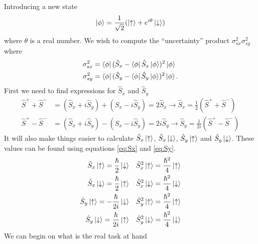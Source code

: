 \documentclass{article}
\begin{document}
Introducing a new state
\begin{equation*}
\ket{\phi}=\frac{1}{\sqrt{2}}(\ket{\uparrow}+e^{i\theta}\ket{\downarrow})
\end{equation*}
where $\theta$ is a real number. We wish to compute the ``uncertainty'' product $\sigma_{sx}^2\sigma_{sy}^2$ where
\begin{align*}
\sigma_{sx}^2 &= \bra{\phi}(\hat{S}_x-\bra{\phi}\hat{S}_x\ket{\phi} )^2\ket{\phi}  \\
\sigma_{sy}^2 &= \bra{\phi}(\hat{S}_y-\bra{\phi}\hat{S}_y\ket{\phi} )^2\ket{\phi}.
\end{align*}
First we need to find expressions for $\hat{S}_x$ and $\hat{S}_y$
\begin{align}
\label{eq:Sx}
\hat{S}^++\hat{S}^- &= (\hat{S}_x + i\hat{S}_y) + (\hat{S}_x-i\hat{S}_y) = 2\hat{S}_x 
\rightarrow \hat{S}_x = \frac{1}{2}(\hat{S}^++\hat{S}^-)\\
\label{eq:Sy}
\hat{S}^+-\hat{S}^- &= (\hat{S}_x + i\hat{S}_y) - (\hat{S}_x-i\hat{S}_y) = 2i\hat{S}_y 
\rightarrow \hat{S}_y = \frac{1}{2i}(\hat{S}^+-\hat{S}^-)
\end{align}
It will also make things easier to calculate $\hat{S}_x\ket{\uparrow}$, $\hat{S}_x\ket{\downarrow}$, $\hat{S}_y\ket{\uparrow}$ and $\hat{S}_y\ket{\downarrow}$. These values can be found using equations \ref{eq:Sx} and \ref{eq:Sy}.
\begin{align*}
\hat{S}_x\ket{\uparrow}		= \frac{\hbar}{2}\ket{\downarrow}& \quad
\hat{S}^2_x\ket{\uparrow}	= \frac{\hbar^2}{4}\ket{\uparrow}\\
\hat{S}_x\ket{\downarrow}	= \frac{\hbar}{2}\ket{\uparrow}& \quad
\hat{S}^2_x\ket{\downarrow}	= \frac{\hbar^2}{4}\ket{\downarrow}\\
\hat{S}_y\ket{\uparrow}		= -\frac{\hbar}{2i}\ket{\downarrow}& \quad
\hat{S}^2_y\ket{\uparrow}	= \frac{\hbar^2}{4}\ket{\uparrow}\\
\hat{S}_y\ket{\downarrow}	= \frac{\hbar}{2i}\ket{\uparrow}& \quad
\hat{S}^2_y\ket{\downarrow}	= \frac{\hbar^2}{4}\ket{\downarrow}\\
\end{align*}
We can begin on what is the real task at hand
\end{document}
